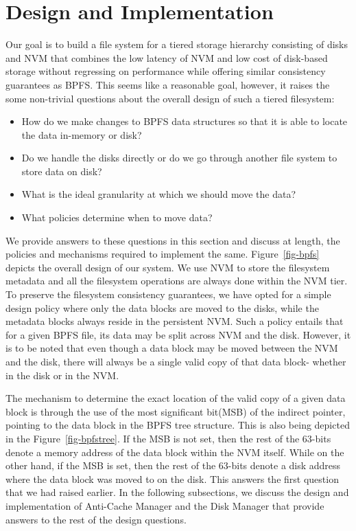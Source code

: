 \section{Design and Implementation}
\label{sec-design}
Our goal is to build a file system for a tiered storage hierarchy consisting of disks and NVM that combines the low latency of NVM and low cost of disk-based storage without regressing on performance while offering similar consistency guarantees as BPFS. This seems like a reasonable goal, however, it raises the some non-trivial questions about the overall design of such a tiered filesystem:

\begin{itemize}
\item How do we make changes to BPFS data structures so that it is able to locate the data in-memory or disk?
\item Do we handle the disks directly or do we go through another file system to store data on disk?
\item What is the ideal granularity at which we should move the data?
\item What policies determine when to move data?
\end{itemize}

We provide answers to these questions in this section and discuss at length, the policies and mechanisms required to implement the same. Figure~\ref{fig-bpfs} depicts the overall design of our system. We use NVM to store the filesystem metadata and all the filesystem operations are always done within the NVM tier. To preserve the filesystem consistency guarantees, we have opted for a simple design policy where only the data blocks are moved to the disks, while the metadata blocks always reside in the persistent NVM. Such a policy entails that for a given BPFS file, its data may be split across NVM and the disk. However, it is to be noted that even though a data block may be moved between the NVM and the disk, there will always be a single valid copy of that data block- whether in the disk or in the NVM.

The mechanism to determine the exact location of the valid copy of a given data block is through the use of the most significant bit(MSB) of the indirect pointer, pointing to the data block in the BPFS tree structure. This is also being depicted in the Figure~\ref{fig-bpfstree}. If the MSB is not set, then the rest of the 63-bits denote a memory address of the data block within the NVM itself. While on the other hand, if the MSB is set, then the rest of the 63-bits denote a disk address where the data block was moved to on the disk. This answers the first question that we had raised earlier. In the following subsections, we discuss the design and implementation of Anti-Cache Manager and the Disk Manager that provide answers to the rest of the design questions.

